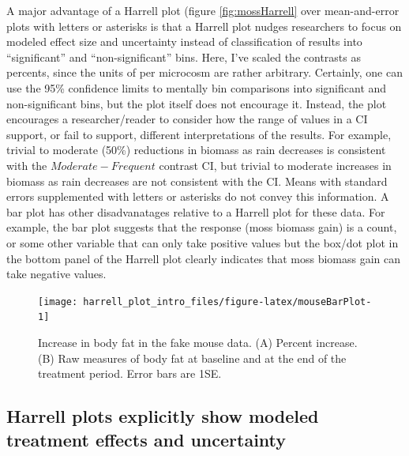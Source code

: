 \documentclass[fleqn,10pt,lineno]{wlpeerj} %
\theoremstyle{definition}
\theoremstyle{definition}
\theoremstyle{definition}
\theoremstyle{remark}
\begin{document}
A major advantage of a Harrell plot (figure \ref{fig:mossHarrell} over
mean-and-error plots with letters or asterisks is that a Harrell plot
nudges researchers to focus on modeled effect size and uncertainty
instead of classification of results into ``significant'' and
``non-significant'' bins. Here, I've scaled the contrasts as percents,
since the units of per microcosm are rather arbitrary. Certainly, one
can use the 95\% confidence limits to mentally bin comparisons into
significant and non-significant bins, but the plot itself does not
encourage it. Instead, the plot encourages a researcher/reader to
consider how the range of values in a CI support, or fail to support,
different interpretations of the results. For example, trivial to
moderate (50\%) reductions in biomass as rain decreases is consistent
with the \(Moderate - Frequent\) contrast CI, but trivial to moderate
increases in biomass as rain decreases are not consistent with the CI.
Means with standard errors supplemented with letters or asterisks do not
convey this information. A bar plot has other disadvanatages relative to
a Harrell plot for these data. For example, the bar plot suggests that
the response (moss biomass gain) is a count, or some other variable that
can only take positive values but the box/dot plot in the bottom panel
of the Harrell plot clearly indicates that moss biomass gain can take
negative values.

\begin{figure}
\texttt{[image: harrell\_plot\_intro\_files/figure-latex/mouseBarPlot-1]} \caption{Increase in body fat in the fake mouse data. (A) Percent increase. (B) Raw measures of body fat at baseline and at the end of the treatment period. Error bars are 1SE. }\label{fig:mouseBarPlot}
\end{figure}

\subsection*{Harrell plots explicitly show modeled treatment effects and
uncertainty}\label{harrell-plots-explicitly-show-modeled-treatment-effects-and-uncertainty}
\end{document}
